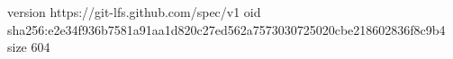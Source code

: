 version https://git-lfs.github.com/spec/v1
oid sha256:e2e34f936b7581a91aa1d820c27ed562a7573030725020cbe218602836f8c9b4
size 604
